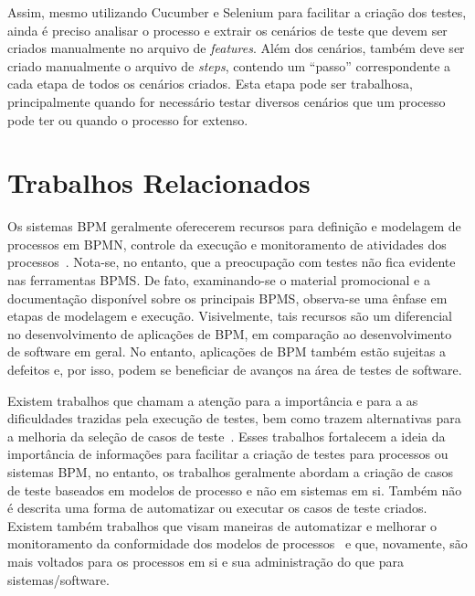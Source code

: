 \documentclass[12pt]{article}
\begin{document}
Assim, mesmo utilizando Cucumber e Selenium para facilitar a criação dos testes, ainda é preciso analisar o processo e extrair os cenários de teste que devem ser criados manualmente no arquivo de \emph{features}. Além dos cenários, também deve ser criado manualmente o arquivo de \emph{steps}, contendo um ``passo'' correspondente a cada etapa de todos os cenários criados. Esta etapa pode ser trabalhosa, principalmente quando for necessário testar diversos cenários que um processo pode ter ou quando o processo for extenso.





\section{Trabalhos Relacionados}\label{sec:related}

Os sistemas BPM geralmente oferecerem recursos para definição e modelagem de processos em BPMN, controle da execução e monitoramento de atividades dos processos~\cite{forrester}. Nota-se, no entanto, que a preocupação com testes não fica evidente nas ferramentas BPMS. De fato, examinando-se o material promocional e a documentação disponível sobre os principais BPMS, observa-se uma ênfase em etapas de modelagem e execução. Visivelmente, tais recursos são um diferencial no desenvolvimento de aplicações de BPM, em comparação ao desenvolvimento de software em geral. No entanto, aplicações de BPM também estão sujeitas a defeitos e, por isso, podem se beneficiar de avanços na área de testes de software.

Existem trabalhos que chamam a atenção para a importância e para a as dificuldades trazidas pela execução de testes, bem como trazem alternativas para a melhoria da seleção de casos de teste~\cite{bohmer2015genetic}. Esses trabalhos fortalecem a ideia da importância de informações para facilitar a criação de testes para processos ou sistemas BPM, no entanto, os trabalhos geralmente abordam a criação de casos de teste baseados em modelos de processo e não em sistemas em si. Também não é descrita uma forma de automatizar ou executar os casos de teste criados. Existem também trabalhos que visam maneiras de automatizar e melhorar o monitoramento da conformidade dos modelos de processos~\cite{ly2015compliance, van2012replaying} e que, novamente, são mais voltados para os processos em si e sua administração do que para sistemas/software.
\end{document}
